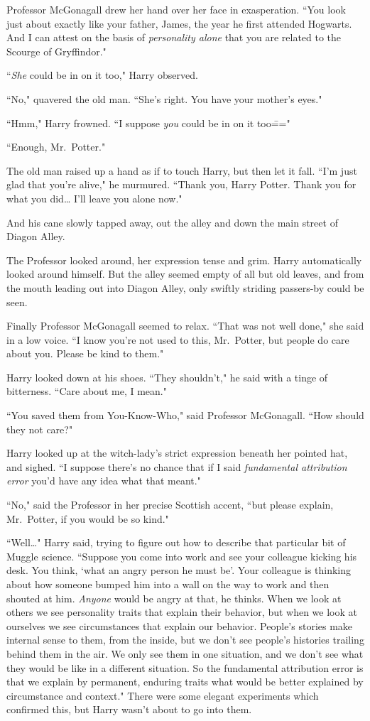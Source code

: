 Professor McGonagall drew her hand over her face in exasperation. ``You look just about exactly like your father, James, the year he first attended Hogwarts. And I can attest on the basis of \emph{personality alone} that you are related to the Scourge of Gryffindor."

``\emph{She} could be in on it too," Harry observed.

``No," quavered the old man. ``She's right. You have your mother's eyes."

``Hmm," Harry frowned. ``I suppose \emph{you} could be in on it too\==="

``Enough, Mr.~Potter."

The old man raised up a hand as if to touch Harry, but then let it fall. ``I'm just glad that you're alive," he murmured. ``Thank you, Harry Potter. Thank you for what you did{\ldots} I'll leave you alone now."

And his cane slowly tapped away, out the alley and down the main street of Diagon Alley.

The Professor looked around, her expression tense and grim. Harry automatically looked around himself. But the alley seemed empty of all but old leaves, and from the mouth leading out into Diagon Alley, only swiftly striding passers-by could be seen.

Finally Professor McGonagall seemed to relax. ``That was not well done," she said in a low voice. ``I know you're not used to this, Mr.~Potter, but people do care about you. Please be kind to them."

Harry looked down at his shoes. ``They shouldn't," he said with a tinge of bitterness. ``Care about me, I mean."

``You saved them from You-Know-Who," said Professor McGonagall. ``How should they not care?"

Harry looked up at the witch-lady's strict expression beneath her pointed hat, and sighed. ``I suppose there's no chance that if I said \emph{fundamental attribution error} you'd have any idea what that meant."

``No," said the Professor in her precise Scottish accent, ``but please explain, Mr.~Potter, if you would be so kind."

``Well{\ldots}" Harry said, trying to figure out how to describe that particular bit of Muggle science. ``Suppose you come into work and see your colleague kicking his desk. You think, `what an angry person he must be'. Your colleague is thinking about how someone bumped him into a wall on the way to work and then shouted at him. \emph{Anyone} would be angry at that, he thinks. When we look at others we see personality traits that explain their behavior, but when we look at ourselves we see circumstances that explain our behavior. People's stories make internal sense to them, from the inside, but we don't see people's histories trailing behind them in the air. We only see them in one situation, and we don't see what they would be like in a different situation. So the fundamental attribution error is that we explain by permanent, enduring traits what would be better explained by circumstance and context." There were some elegant experiments which confirmed this, but Harry wasn't about to go into them.

